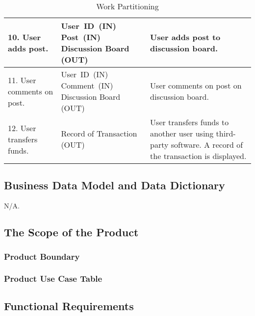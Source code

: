 \documentclass[12pt, titlepage]{article}
\begin{document}
\begin{table}
\begin{tabular}{|p{5cm}|p{5cm}|p{5cm}|}
\hline
10. User adds post. & \mbox{User ID (IN)} \linebreak \mbox{Post (IN)} \linebreak Discussion Board (OUT) & User adds post to discussion board. \\
\hline
11. User comments on post. & \mbox{User ID (IN)} \linebreak \mbox{Comment (IN)} \linebreak Discussion Board (OUT) & User comments on post on discussion board. \\
\hline
12. User transfers funds. & Record of Transaction (OUT) & User transfers funds to another user using third-party software. A record of the transaction is displayed. \\
\hline
\end{tabular}
\caption{Work Partitioning}
\end{table}

\subsection{Business Data Model and Data Dictionary}
N/A.
\subsection{The Scope of the Product}

\subsubsection{Product Boundary}
\subsubsection{Product Use Case Table}
\subsection{Functional Requirements}
\end{document}
